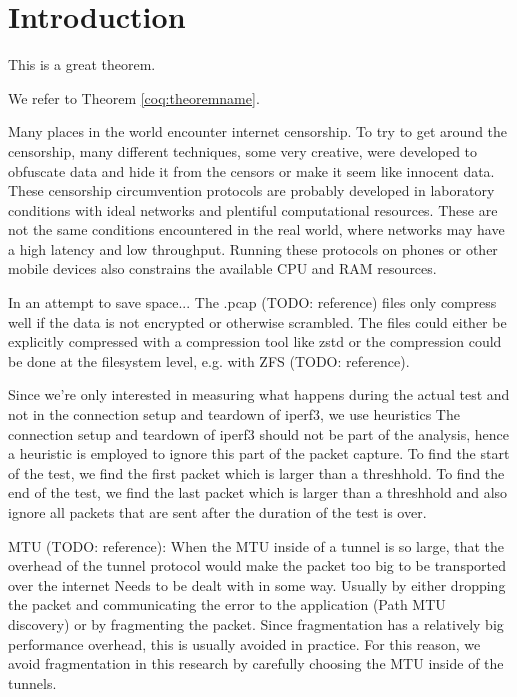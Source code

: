 
\chapter{Introduction}


\begin{theorem}[Test][theoremname]
  This is a great theorem.
\end{theorem}

We refer to Theorem \ref{coq:theoremname}.


Many places in the world encounter internet censorship. To try to get around the censorship, many different techniques, some very creative, were developed to obfuscate data and hide it from the censors or make it seem like innocent data. These censorship circumvention protocols are probably developed in laboratory conditions with ideal networks and plentiful computational resources. These are not the same conditions encountered in the real world, where networks may have a high latency and low throughput. Running these protocols on phones or other mobile devices also constrains the available CPU and RAM resources.



In an attempt to save space...
The .pcap (TODO: reference) files only compress well if the data is not encrypted or otherwise scrambled.
The files could either be explicitly compressed with a compression tool like zstd or the compression could be done at the filesystem level, e.g. with ZFS (TODO: reference).


Since we're only interested in measuring what happens during the actual test and not in the connection setup and teardown of iperf3, we use heuristics
The connection setup and teardown of iperf3 should not be part of the analysis, hence a heuristic is employed to ignore this part of the packet capture. To find the start of the test, we find the first packet which is larger than a threshhold. To find the end of the test, we find the last packet which is larger than a threshhold and also ignore all packets that are sent after the duration of the test is over.

MTU (TODO: reference):
When the MTU inside of a tunnel is so large, that the overhead of the tunnel protocol would make the packet too big to be transported over the internet
Needs to be dealt with in some way. Usually by either dropping the packet and communicating the error to the application (Path MTU discovery) or by fragmenting the packet. Since fragmentation has a relatively big performance overhead, this is usually avoided in practice. For this reason, we avoid fragmentation in this research by carefully choosing the MTU inside of the tunnels.

